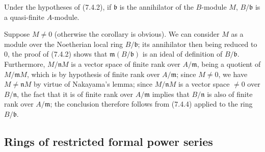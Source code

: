 \begin{corollary}[7.4.5]
\label{0.7.4.5}
Under the hypotheses of (7.4.2), if $\mathfrak b$ is the annihilator of the
$B$-module $M$, $B/\mathfrak b$ is a quasi-finite $A$-module.
\end{corollary}

Suppose $M\neq0$ (otherwise the corollary is obvious). We can consider $M$
as a module over the Noetherian local ring $B/\mathfrak b$; its annihilator
then being reduced to $0$, the proof of (7.4.2) shows that
$\mathfrak m(B/\mathfrak b)$ is an ideal of definition of
$B/\mathfrak b$. Furthermore, $M/\mathfrak nM$ is a vector space of
finite rank over $A/\mathfrak m$, being a quotient of $M/\mathfrak mM$, which is
by hypothesis of finite rank over $A/\mathfrak m$; since $M\neq0$, we have
$M\neq\mathfrak nM$ by virtue of Nakayama's lemma; since
$M/\mathfrak nM$ is a vector space $\neq0$ over $B/\mathfrak n$, the fact
that it is of finite rank over $A/\mathfrak m$ implies that $B/\mathfrak n$ is
also of finite rank over $A/\mathfrak m$; the conclusion therefore follows from (7.4.4)
applied to the ring $B/\mathfrak b$.


\subsection{Rings of restricted formal power series}
\label{subsection:0.7.5}

